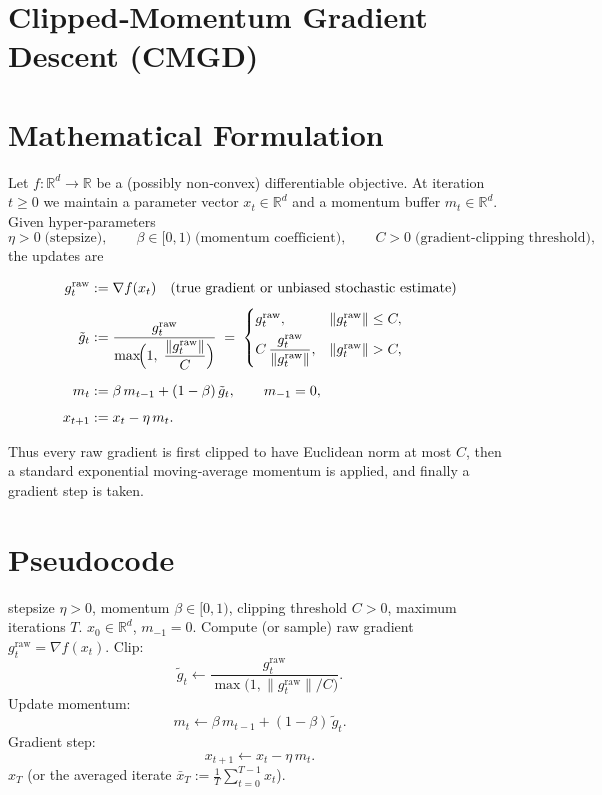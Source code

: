 \documentclass{article}
\begin{document}
\section*{Clipped‑Momentum Gradient Descent (CMGD)}

\section*{Mathematical Formulation}
Let $f:\mathbb{R}^d\rightarrow\mathbb{R}$ be a (possibly non‑convex) differentiable objective.  
At iteration $t\ge 0$ we maintain a parameter vector $x_t\in\mathbb{R}^d$ and a momentum buffer $m_t\in\mathbb{R}^d$.
Given hyper‑parameters
\[
\eta>0\;\text{(stepsize)},\qquad
\beta\in[0,1)\;\text{(momentum coefficient)},\qquad
C>0\;\text{(gradient‑clipping threshold)},
\]
the updates are

\begin{align}
g_t^{\text{raw}} &:= \nabla f(x_t) \quad\text{(true gradient or unbiased stochastic estimate)}\label{eq:raw}\\[4pt]
\tilde g_t &:= \frac{g_t^{\text{raw}}}{\displaystyle \max\!\Bigl(1,\;\frac{\|g_t^{\text{raw}}\|}{C}\Bigr)} 
            \;=\;
            \begin{cases}
                g_t^{\text{raw}}, & \|g_t^{\text{raw}}\|\le C,\\[4pt]
                C\,\dfrac{g_t^{\text{raw}}}{\|g_t^{\text{raw}}\|}, & \|g_t^{\text{raw}}\|> C,
            \end{cases}\label{eq:clip}\\[6pt]
m_t &:= \beta\,m_{t-1} + (1-\beta)\,\tilde g_t,\qquad m_{-1}=0,\label{eq:momentum}\\[4pt]
x_{t+1} &:= x_t - \eta\, m_t.\label{eq:update}
\end{align}

Thus every raw gradient is first clipped to have Euclidean norm at most $C$, then a standard exponential moving‑average momentum is applied, and finally a gradient step is taken.

\section*{Pseudocode}
\begin{algorithm}[H]
\caption{Clipped‑Momentum Gradient Descent (CMGD)}
\begin{algorithmic}[1]
 stepsize $\eta>0$, momentum $\beta\in[0,1)$, clipping threshold $C>0$, 
maximum iterations $T$.
 $x_0\in\mathbb{R}^d$, $m_{-1}=0$.
    \STATE Compute (or sample) raw gradient $g_t^{\text{raw}}=\nabla f(x_t)$.
    \STATE Clip:
    \[
    \tilde g_t \leftarrow 
    \frac{g_t^{\text{raw}}}{\max\!\bigl(1,\|g_t^{\text{raw}}\|/C\bigr)}.
    \]
    \STATE Update momentum:
    \[
    m_t \leftarrow \beta\,m_{t-1}+(1-\beta)\,\tilde g_t .
    \]
    \STATE Gradient step:
    \[
    x_{t+1}\leftarrow x_t-\eta\,m_t .
    \]
\ENDFOR
{} $x_T$ (or the averaged iterate $\bar x_T:=\frac1T\sum_{t=0}^{T-1}x_t$).
\end{algorithmic}
\end{algorithm}
\end{document}
